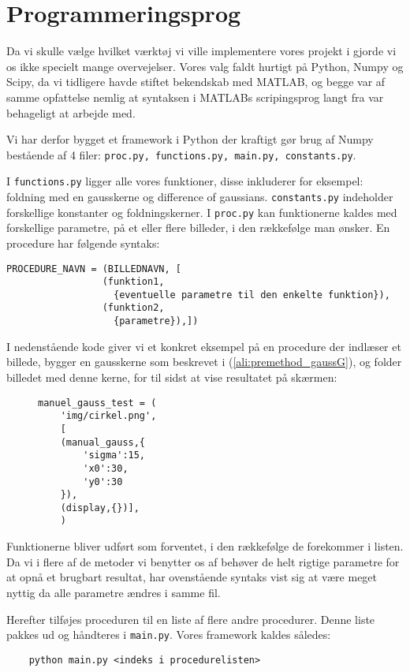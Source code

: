 \section{Programmeringsprog}
Da vi skulle vælge hvilket værktøj vi ville implementere vores projekt i gjorde vi os ikke specielt mange overvejelser. 
Vores valg faldt hurtigt på Python, Numpy og Scipy, da vi tidligere havde stiftet bekendskab med MATLAB, og begge var af samme opfattelse nemlig
at syntaksen i MATLABs scripingsprog langt fra var behageligt at arbejde med.


Vi har derfor bygget et framework i Python der kraftigt gør brug af Numpy bestående af 4 filer: \texttt{proc.py, functions.py, main.py, constants.py}.

I \texttt{functions.py} ligger alle vores funktioner, disse inkluderer for eksempel: foldning med en gausskerne og difference of gaussians.
\texttt{constants.py} indeholder forskellige konstanter og foldningskerner. I \texttt{proc.py} kan funktionerne kaldes med forskellige parametre, på et eller flere billeder, i den rækkefølge man ønsker.
En procedure har følgende syntaks:
\begin{verbatim}
PROCEDURE_NAVN = (BILLEDNAVN, [
                 (funktion1,
                   {eventuelle parametre til den enkelte funktion}),
                 (funktion2,
                   {parametre}),])
\end{verbatim}
I nedenstående kode giver vi et konkret eksempel på en procedure der indlæser et billede, bygger en gausskerne som beskrevet i (\ref{ali:premethod_gaussG}), og folder billedet med denne kerne, for til sidst at vise resultatet på skærmen:
\begin{figure}[H]
\begin{verbatim}
manuel_gauss_test = ( 
    'img/cirkel.png',
    [
    (manual_gauss,{
        'sigma':15,
        'x0':30,
        'y0':30
    }),
    (display,{})],
    )
\end{verbatim}
\end{figure}
Funktionerne bliver udført som forventet, i den rækkefølge de forekommer i listen.
Da vi i flere af de metoder vi benytter os af behøver de helt rigtige parametre for at opnå et brugbart resultat, har ovenstående syntaks vist sig at være meget nyttig da alle parametre ændres i samme fil.

Herefter tilføjes proceduren til en liste af flere andre procedurer. Denne liste pakkes ud og håndteres i \texttt{main.py}. Vores framework kaldes således: 
\begin{verbatim}
	python main.py <indeks i procedurelisten>
\end{verbatim}

